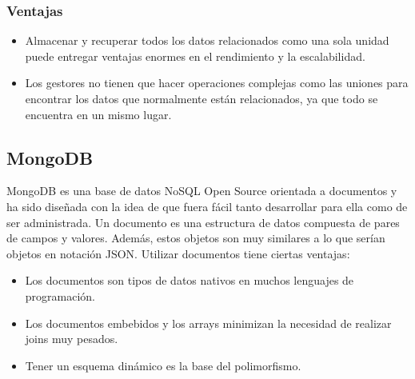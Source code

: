 \documentclass[preprint,12pt]{elsarticle}
\begin{document}
\subsubsection{\textbf{Ventajas}}
\begin{itemize}

\item Almacenar y recuperar todos los datos relacionados como una sola unidad puede entregar ventajas enormes en el rendimiento y la escalabilidad.
\item Los gestores no tienen que hacer operaciones complejas como las uniones para encontrar los datos que normalmente están relacionados, ya que todo se encuentra en un mismo lugar.

\end{itemize}

\subsection {\textbf{MongoDB}}
MongoDB es una base de datos NoSQL Open Source orientada a documentos y ha sido diseñada con la idea de que fuera fácil tanto desarrollar para ella como de ser administrada. Un documento es una estructura de datos compuesta de pares de campos y valores. Además, estos objetos son muy similares a lo que serían objetos en notación JSON.\newline
Utilizar documentos tiene ciertas ventajas:
\begin{itemize}

\item Los documentos son tipos de datos nativos en muchos lenguajes de programación.
\item Los documentos embebidos y los arrays minimizan la necesidad de realizar joins muy pesados.
\item Tener un esquema dinámico es la base del polimorfismo.

\end{itemize}
\end{document}
